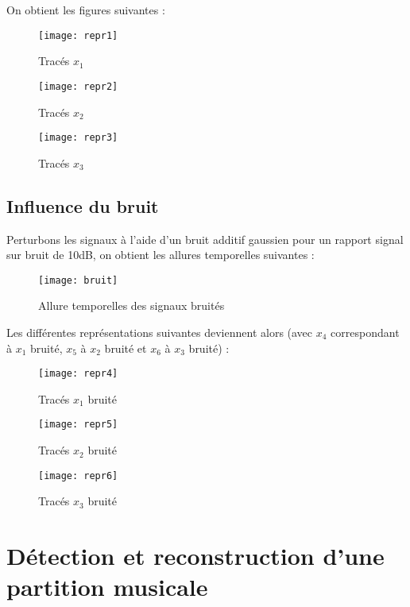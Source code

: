 \documentclass[12pt,a4paper,titlepage]{article}
\begin{document}
On obtient les figures suivantes :

\begin{figure}[H]
    \caption{Tracés $x_1$}
    \texttt{[image: repr1]}
    \centering
\end{figure}

\begin{figure}[H]
    \caption{Tracés $x_2$}
    \texttt{[image: repr2]}
    \centering
\end{figure}

\begin{figure}[H]
    \caption{Tracés $x_3$}
    \texttt{[image: repr3]}
    \centering
\end{figure}

\subsection{Influence du bruit}

Perturbons les signaux à l'aide d'un bruit additif gaussien pour un rapport signal sur bruit de
10dB, on obtient les allures temporelles suivantes :

\begin{figure}[H]
    \caption{Allure temporelles des signaux bruités}
    \texttt{[image: bruit]}
    \centering
\end{figure}

Les différentes représentations suivantes deviennent alors (avec $x_4$ correspondant à $x_1$ bruité,
$x_5$ à $x_2$ bruité et $x_6$ à $x_3$ bruité) :

\begin{figure}[H]
    \caption{Tracés $x_1$ bruité}
    \texttt{[image: repr4]}
    \centering
\end{figure}

\begin{figure}[H]
    \caption{Tracés $x_2$ bruité}
    \texttt{[image: repr5]}
    \centering
\end{figure}

\begin{figure}[H]
    \caption{Tracés $x_3$ bruité}
    \texttt{[image: repr6]}
    \centering
\end{figure}

\pagebreak

\section{Détection et reconstruction d'une partition musicale}
\end{document}
